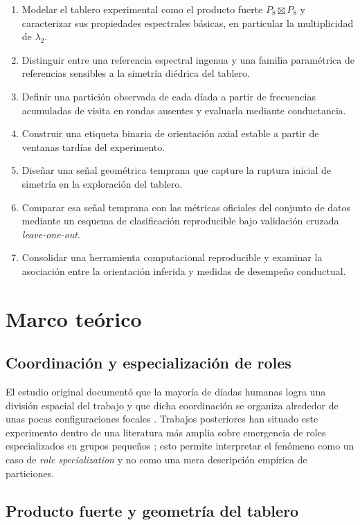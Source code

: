 \documentclass[journal]{IEEEtran}
\begin{document}
\begin{enumerate}
\item Modelar el tablero experimental como el producto fuerte $P_8 \boxtimes P_8$ y caracterizar sus propiedades espectrales básicas, en particular la multiplicidad de $\lambda_2$.
\item Distinguir entre una referencia espectral ingenua y una familia paramétrica de referencias sensibles a la simetría diédrica del tablero.
\item Definir una partición observada de cada díada a partir de frecuencias acumuladas de visita en rondas ausentes y evaluarla mediante conductancia.
\item Construir una etiqueta binaria de orientación axial estable a partir de ventanas tardías del experimento.
\item Diseñar una señal geométrica temprana que capture la ruptura inicial de simetría en la exploración del tablero.
\item Comparar esa señal temprana con las métricas oficiales del conjunto de datos mediante un esquema de clasificación reproducible bajo validación cruzada \emph{leave-one-out}.
\item Consolidar una herramienta computacional reproducible y examinar la asociación entre la orientación inferida y medidas de desempeño conductual.
\end{enumerate}

\section{Marco teórico}\label{sec:marco}

\subsection{Coordinación y especialización de roles}

El estudio original documentó que la mayoría de díadas humanas logra una división espacial del trabajo y que dicha coordinación se organiza alrededor de unas pocas configuraciones focales \cite{andrade2021}. Trabajos posteriores han situado este experimento dentro de una literatura más amplia sobre emergencia de roles especializados en grupos pequeños \cite{goldstone2024}; esto permite interpretar el fenómeno como un caso de \emph{role specialization} y no como una mera descripción empírica de particiones.

\subsection{Producto fuerte y geometría del tablero}
\end{document}
